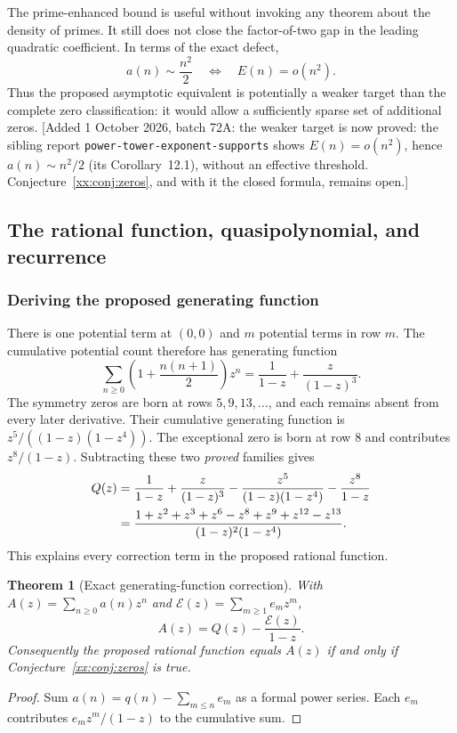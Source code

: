 \documentclass[11pt,a4paper]{article}
\numberwithin{equation}{section}
\newtheorem{theorem}{Theorem}[section]
\theoremstyle{definition}
\theoremstyle{remark}
\theoremstyle{plain}
\newcommand{\sibPTE}{\texttt{power-\allowbreak{}tower-\allowbreak{}exponent-\allowbreak{}supports}}
\begin{document}
The prime-enhanced bound is useful without invoking any theorem about the
density of primes. It still does not close the factor-of-two gap in the
leading quadratic coefficient. In terms of the exact defect,
\begin{equation}\label{xx:eq:asympeq}
 a(n)\sim\frac{n^2}{2}\quad\Longleftrightarrow\quad E(n)=o(n^2).
\end{equation}
Thus the proposed asymptotic equivalent is potentially a weaker target than
the complete zero classification: it would allow a sufficiently sparse set
of additional zeros.  [Added 1 October 2026, batch 72A: the weaker target is now proved: the
sibling report \sibPTE{} shows $E(n)=o(n^2)$, hence
$a(n)\sim n^2/2$ (its Corollary~12.1), without an effective threshold.
Conjecture~\ref{xx:conj:zeros}, and with it the closed formula, remains open.]

\subsection{The rational function, quasipolynomial, and recurrence}\label{xx:sec:gf}

\subsubsection{Deriving the proposed generating function}
There is one potential term at $(0,0)$ and $m$ potential terms in row $m$.
The cumulative potential count therefore has generating function
\[
 \sum_{n\ge0}\left(1+\frac{n(n+1)}2\right)z^n
 =\frac1{1-z}+\frac{z}{(1-z)^3}.
\]
The symmetry zeros are born at rows $5,9,13,\ldots$, and each remains
absent from every later derivative. Their cumulative generating function is
$z^5/((1-z)(1-z^4))$. The exceptional zero is born at row $8$ and
contributes $z^8/(1-z)$. Subtracting these two \emph{proved} families gives
\begin{align}
 Q(z)
 &=\frac1{1-z}+\frac{z}{(1-z)^3}
       -\frac{z^5}{(1-z)(1-z^4)}-\frac{z^8}{1-z}\notag\\
 &=\frac{1+z^2+z^3+z^6-z^8+z^9+z^{12}-z^{13}}
        {(1-z)^2(1-z^4)}.\label{xx:eq:gfderive}
\end{align}
This explains every correction term in the proposed rational function.

\begin{theorem}[Exact generating-function correction]\label{xx:thm:gfdefect}
With $A(z)=\sum_{n\ge0}a(n)z^n$ and
$\mathcal E(z)=\sum_{m\ge1}e_m z^m$,
\begin{equation}\label{xx:eq:gfdefect}
 A(z)=Q(z)-\frac{\mathcal E(z)}{1-z}.
\end{equation}
Consequently the proposed rational function equals $A(z)$ if and only if
Conjecture~\ref{xx:conj:zeros} is true.
\end{theorem}
\begin{proof}
Sum $a(n)=q(n)-\sum_{m\le n}e_m$ as a formal power series. Each $e_m$
contributes $e_mz^m/(1-z)$ to the cumulative sum.
\end{proof}
\end{document}
